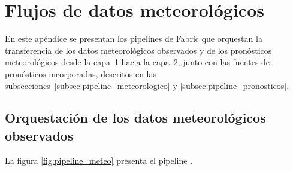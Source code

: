 
\chapter{Flujos de datos meteorológicos} %

\label{AppendixC}

En este apéndice se presentan los pipelines de Fabric que orquestan la transferencia de los datos meteorológicos observados y de los pronósticos meteorológicos desde la capa~1 hacia la capa~2, junto con las fuentes de pronósticos incorporadas, descritos en las subsecciones~\ref{subsec:pipeline_meteorologico} y \ref{subsec:pipeline_pronosticos}.

\section{Orquestación de los datos meteorológicos observados}
\label{sec:apendice_ppln_meteo}

La figura \ref{fig:pipeline_meteo} presenta el pipeline .

